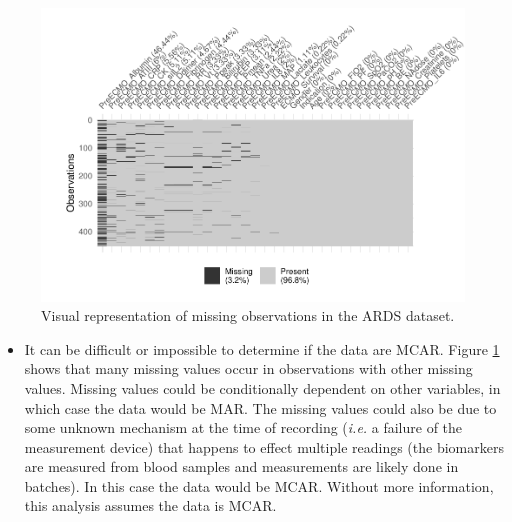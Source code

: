 \documentclass[12pt,]{article}
\providecommand{\tightlist}{%
  \setlength{\itemsep}{0pt}\setlength{\parskip}{0pt}}
\begin{document}
\begin{figure}[H]

{\centering \includegraphics[width=1\linewidth]{figure/graphics-missing-data-1} 

}

\caption{\label{fig.ensemble-imputation}Visual representation of missing observations in the ARDS dataset.}\label{fig:missing-data}
\end{figure}

\begin{itemize}
\tightlist
\item
  It can be difficult or impossible to determine if the data are MCAR.
  Figure \ref{fig:missing-data} shows that many missing values occur in
  observations with other missing values. Missing values could be
  conditionally dependent on other variables, in which case the data
  would be MAR. The missing values could also be due to some unknown
  mechanism at the time of recording (\emph{i.e.} a failure of the
  measurement device) that happens to effect multiple readings (the
  biomarkers are measured from blood samples and measurements are likely
  done in batches). In this case the data would be MCAR. Without more
  information, this analysis assumes the data is MCAR.
\end{itemize}
\end{document}
